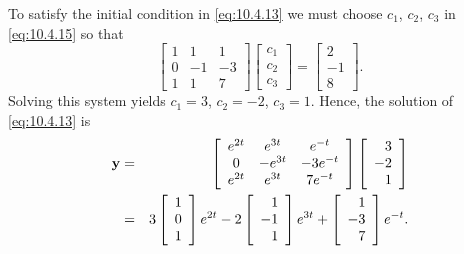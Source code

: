 \begin{examplesolution}
 To satisfy the initial condition in \eqref{eq:10.4.13} we must choose $c_{1}$,
$c_{2}$, $c_{3}$ in \eqref{eq:10.4.15} so that
\[
  \left[
  \begin{array}{rrr}
    1 & 1  & 1  \\
    0 & -1 & -3 \\
    1 & 1  & 7
  \end{array}\right] \left[
  \begin{array}{c}
    c_{1} \\
    c_{2} \\
    c_{3}
  \end{array}\right]= \left[
  \begin{array}{r}
    2  \\
    -1 \\
    8
  \end{array}\right].
\]
Solving this system yields $c_{1}=3$, $c_{2}=-2$, $c_{3}=1$. Hence, the solution of
\eqref{eq:10.4.13} is
\begin{eqnarray*}
  {\bf y}&=&\left[
  \begin{array}{ccc}
    e^{2t} & e^{3t}  & e^{-t}   \\
    0      & -e^{3t} & -3e^{-t} \\
    e^{2t} & e^{3t}  & 7e^{-t}
  \end{array}
  \right] \left[
  \begin{array}{r}
    3  \\
    -2 \\
    1
  \end{array}\right]\\ &=&3\left[
  \begin{array}{r}
    1 \\
    0 \\
    1
  \end{array}\right]e^{2t}-2 \left[
  \begin{array}{r}
    1  \\
    -1 \\
    1
  \end{array}\right] e^{3t}+\left[
  \begin{array}{r}
    1  \\
    -3 \\
    7
  \end{array}
  \right]e^{-t}.
\end{eqnarray*}
\end{examplesolution}

